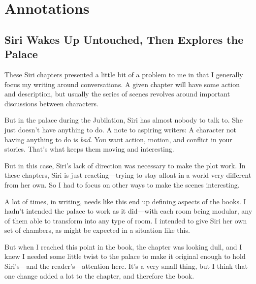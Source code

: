 \section*{Annotations}

\subsection*{Siri Wakes Up Untouched, Then Explores the Palace}

These Siri chapters presented a little bit of a problem to me in that I generally focus my writing around conversations. A given chapter will have some action and description, but usually the series of scenes revolves around important discussions between characters.

But in the palace during the Jubilation, Siri has almost nobody to talk to. She just doesn’t have anything to do. A note to aspiring writers: A character not having anything to do is \textit{bad}. You want action, motion, and conflict in your stories. That’s what keeps them moving and interesting.

But in this case, Siri’s lack of direction was necessary to make the plot work. In these chapters, Siri is just reacting—trying to stay afloat in a world very different from her own. So I had to focus on other ways to make the scenes interesting.

A lot of times, in writing, needs like this end up defining aspects of the books. I hadn’t intended the palace to work as it did—with each room being modular, any of them able to transform into any type of room. I intended to give Siri her own set of chambers, as might be expected in a situation like this.

But when I reached this point in the book, the chapter was looking dull, and I knew I needed some little twist to the palace to make it original enough to hold Siri’s—and the reader’s—attention here. It’s a very small thing, but I think that one change added a lot to the chapter, and therefore the book.



